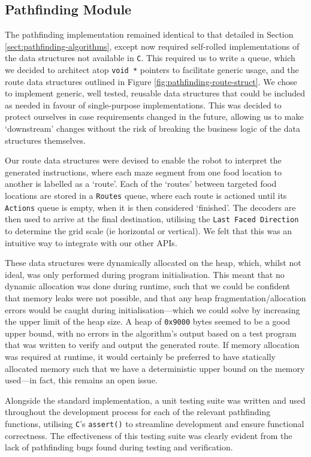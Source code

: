 \documentclass[conference]{IEEEtran}
\begin{document}
\subsection{Pathfinding Module}

The pathfinding implementation remained identical to that detailed in Section \ref{sect:pathfinding-algorithms}, except now required self-rolled implementations of the data structures not available in \texttt{C}.
This required us to write a queue, which we decided to architect atop \texttt{void *} pointers to facilitate generic usage, and the route data structures outlined in Figure \ref{fig:pathfinding-route-struct}.
We chose to implement generic, well tested, reusable data structures that could be included as needed in favour of single-purpose implementations.
This was decided to protect ourselves in case requirements changed in the future, allowing us to make `downstream' changes without the risk of breaking the business logic of the data structures themselves.

Our route data structures were devised to enable the robot to interpret the generated instructions, where each maze segment from one food location to another is labelled as a `route'.
Each of the `routes' between targeted food locations are stored in a \texttt{Routes} queue, where each route is actioned until its \texttt{Actions} queue is empty, when it is then considered `finished'.
The decoders are then used to arrive at the final destination, utilising the \texttt{Last Faced Direction} to determine the grid scale (ie horizontal or vertical).
We felt that this was an intuitive way to integrate with our other APIs.

These data structures were dynamically allocated on the heap, which, whilst not ideal, was only performed during program initialisation.
This meant that no dynamic allocation was done during runtime, such that we could be confident that memory leaks were not possible, and that any heap fragmentation/allocation errors would be caught during initialisation—which we could solve by increasing the upper limit of the heap size.
A heap of \texttt{0x9000} bytes seemed to be a good upper bound, with no errors in the algorithm's output based on a test program that was written to verify and output the generated route.
If memory allocation was required at runtime, it would certainly be preferred to have statically allocated memory such that we have a deterministic upper bound on the memory used—in fact, this remains an open issue.

Alongside the standard implementation, a unit testing suite was written and used throughout the development process for each of the relevant pathfinding functions, utilising \texttt{C}'s \texttt{assert()} to streamline development and ensure functional correctness.
The effectiveness of this testing suite was clearly evident from the lack of pathfinding bugs found during testing and verification.
\end{document}
